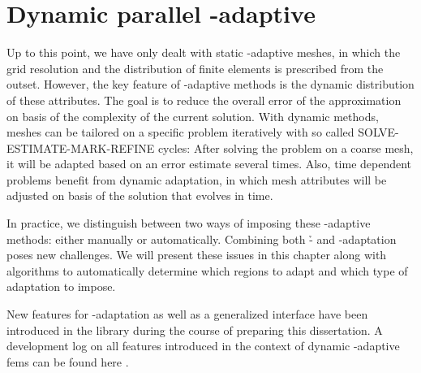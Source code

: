 \chapter{Dynamic parallel \hp-adaptive }
\label{ch:dynamic}
\glsresetall

Up to this point, we have only dealt with static \hp-adaptive meshes, in which the grid resolution and the distribution of finite elements is prescribed from the outset.%
However, the key feature of \hp-adaptive methods is the dynamic distribution of these attributes. The goal is to reduce the overall error of the approximation on basis of the complexity of the current solution. With dynamic methods, meshes can be tailored on a specific problem iteratively with so called SOLVE-ESTIMATE-MARK-REFINE cycles: After solving the problem on a coarse mesh, it will be adapted based on an error estimate several times. Also, time dependent problems benefit from dynamic adaptation, in which mesh attributes will be adjusted on basis of the solution that evolves in time.

In practice, we distinguish between two ways of imposing these \hp-adaptive methods: either manually or automatically. Combining both \h- and \p-adaptation poses new challenges. We will present these issues in this chapter along with algorithms to automatically determine which regions to adapt and which type of adaptation to impose.

New features for \hp-adaptation as well as a generalized interface have been introduced in the \dealii{} library \textcite{dealii920pre} during the course of preparing this dissertation. A development log on all features introduced in the context of dynamic \hp-adaptive \glspl{fem} can be found here \cite{dealiiissue7515}.





